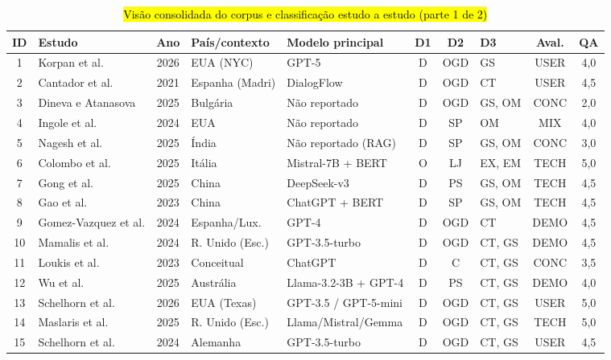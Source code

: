 \documentclass[brazilian]{sbc2025}
\newif\ifhl \hltrue
\newcommand{\rev}[1]{\ifhl\sethlcolor{yellow}\hl{#1}\else#1\fi}
\begin{document}
\begin{table}[p]
\centering
\caption{\rev{Visão consolidada do corpus e classificação estudo a estudo (parte 1 de 2)}}
\label{tab:corpus_consolidado}
\tiny
\begin{tabular}{|c|>{\raggedright\arraybackslash}p{2.55cm}|c|>{\raggedright\arraybackslash}p{1.65cm}|>{\raggedright\arraybackslash}p{2.2cm}|c|c|>{\raggedright\arraybackslash}p{1.4cm}|c|c|}
\hline
\textbf{ID} & \textbf{Estudo} & \textbf{Ano} & \textbf{País/contexto} & \textbf{Modelo principal} & \textbf{D1} & \textbf{D2} & \textbf{D3} & \textbf{Aval.} & \textbf{QA} \\ \hline
1  & Korpan et al.        & 2026 & EUA (NYC)       & GPT-5                  & D & OGD & GS       & USER & 4,0 \\ \hline
2  & Cantador et al.      & 2021 & Espanha (Madri)  & DialogFlow             & D & OGD & CT       & USER & 4,5 \\ \hline
3  & Dineva e Atanasova   & 2025 & Bulgária         & Não reportado          & D & OGD & GS, OM   & CONC & 2,0 \\ \hline
4  & Ingole et al.        & 2024 & EUA              & Não reportado          & D & SP  & OM       & MIX  & 4,0 \\ \hline
5  & Nagesh et al.        & 2025 & Índia            & Não reportado (RAG)    & D & SP  & GS, OM   & CONC & 3,0 \\ \hline
6  & Colombo et al.       & 2025 & Itália           & Mistral-7B + BERT      & O & LJ  & EX, EM   & TECH & 5,0 \\ \hline
7  & Gong et al.          & 2025 & China            & DeepSeek-v3            & D & PS  & GS, OM   & TECH & 4,5 \\ \hline
8  & Gao et al.           & 2023 & China            & ChatGPT + BERT         & D & SP  & GS, OM   & TECH & 4,5 \\ \hline
9  & Gomez-Vazquez et al. & 2024 & Espanha/Lux.     & GPT-4                  & D & OGD & CT       & DEMO & 4,5 \\ \hline
10 & Mamalis et al.       & 2024 & R. Unido (Esc.)  & GPT-3.5-turbo          & D & OGD & CT, GS   & DEMO & 4,5 \\ \hline
11 & Loukis et al.        & 2023 & Conceitual       & ChatGPT                & D & C   & CT, GS   & CONC & 3,5 \\ \hline
12 & Wu et al.            & 2025 & Austrália        & Llama-3.2-3B + GPT-4   & D & PS  & CT, GS   & DEMO & 4,0 \\ \hline
13 & Schelhorn et al.     & 2026 & EUA (Texas)      & GPT-3.5 / GPT-5-mini   & D & OGD & CT, GS   & USER & 5,0 \\ \hline
14 & Maslaris et al.      & 2025 & R. Unido (Esc.)  & Llama/Mistral/Gemma    & D & OGD & CT, GS   & TECH & 5,0 \\ \hline
15 & Schelhorn et al.     & 2024 & Alemanha         & GPT-3.5-turbo          & D & OGD & CT, GS   & USER & 4,5 \\ \hline
\end{tabular}
\end{table}
\end{document}
